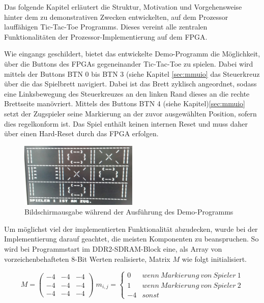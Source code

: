 
Das folgende Kapitel erl\"autert die Struktur, Motivation und Vorgehensweise hinter dem zu demonstrativen Zwecken entwickelten, auf dem Prozessor lauff\"ahigen Tic-Tac-Toe Programms. Dieses vereint alle zentralen Funktionalit\"aten der Prozessor-Implementierung auf dem FPGA.


Wie eingangs geschildert, bietet das entwickelte Demo-Programm die M\"oglichkeit, \"uber die Buttons des FPGAs gegeneinander Tic-Tac-Toe zu spielen. Dabei wird mittels der Buttons BTN 0 bis BTN 3 (siehe Kapitel \ref{sec:mmuio} das Steuerkreuz über die das Spielbrett navigiert. Dabei ist das Brett zyklisch angeordnet, sodass eine Linksbewegung des Steuerkreuzes an den linken Rand dieses an die rechte Brettseite manövriert. Mittels des Buttons BTN 4 (siehe Kapitel)\ref{sec:mmuio} setzt der Zugspieler seine Markierung an der zuvor ausgewählten Position, sofern dies regelkonform ist. Das Spiel enthält keinen internen Reset und muss daher über einen Hard-Reset durch das FPGA erfolgen.

\begin{figure}[H]
	\centering
		\includegraphics[width=0.5\textwidth]{gameplay.png}
	\caption{Bildschirmausgabe w\"ahrend der Ausf\"uhrung des Demo-Programms}
	\label{fig:gameplay}
\end{figure}

Um möglichst viel der implementierten Funktionalität abzudecken, wurde bei der Implementierung darauf geachtet, die meisten Komponenten zu beanspruchen. So wird bei Programmstart im DDR2-SDRAM-Block eine, als Array von vorzeichenbehafteten 8-Bit Werten realisierte, Matrix $M$ wie folgt initialisiert.

\[ M = \begin{pmatrix} -4 & -4 & -4\\ -4 & -4 & -4\\ -4 & -4 & -4  \end{pmatrix}\;
 m_{i,j} = \begin{cases}
	0 & wenn\:Markierung\:von\:Spieler\:1 \\
	1 & wenn\:Markierung\:von\:Spieler\:2 \\
	-4 & sonst

\end{cases}\]

